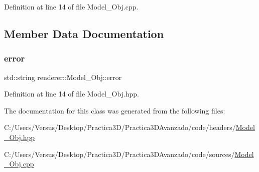 Definition at line 14 of file Model\+\_\+\+Obj.\+cpp.



\subsection{Member Data Documentation}
\mbox{\label{classrenderer_1_1_model___obj_a8c370b89798744d421ade1466f0c9ad1}} 
\subsubsection{\texorpdfstring{error}{error}}
{\footnotesize\ttfamily std\+::string renderer\+::\+Model\+\_\+\+Obj\+::error\hspace{0.3cm}{\ttfamily [private]}}



Definition at line 14 of file Model\+\_\+\+Obj.\+hpp.



The documentation for this class was generated from the following files\+:\begin{DoxyCompactItemize}
\item 
C\+:/\+Users/\+Versus/\+Desktop/\+Practica3\+D/\+Practica3\+D\+Avanzado/code/headers/\mbox{\hyperlink{_model___obj_8hpp}{Model\+\_\+\+Obj.\+hpp}}\item 
C\+:/\+Users/\+Versus/\+Desktop/\+Practica3\+D/\+Practica3\+D\+Avanzado/code/sources/\mbox{\hyperlink{_model___obj_8cpp}{Model\+\_\+\+Obj.\+cpp}}\end{DoxyCompactItemize}
